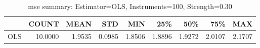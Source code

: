 \begin{table}[ht]
\centering
\caption{mse summary: Estimator=OLS, Instruments=100, Strength=0.30}
\begin{tabular}{lrrrrrrrr}
\toprule
 & COUNT & MEAN & STD & MIN & 25\% & 50\% & 75\% & MAX \\
\midrule
OLS & 10.0000 & 1.9535 & 0.0985 & 1.8506 & 1.8896 & 1.9272 & 2.0107 & 2.1707 \\
\bottomrule
\end{tabular}
\end{table}
